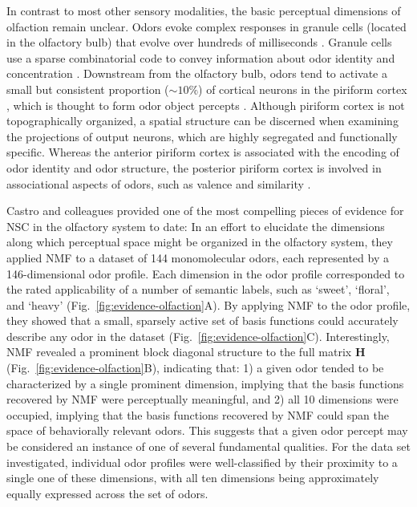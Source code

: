 In contrast to most other sensory modalities, 
the basic perceptual dimensions of olfaction remain unclear.
Odors evoke complex responses in granule cells (located in the olfactory bulb)
that evolve over hundreds of milliseconds \cite{Broome2006}.
Granule cells use a sparse combinatorial code to convey information about odor identity
and concentration \cite{Koulakov2011,Gupta2015}.
Downstream from the olfactory bulb, odors tend to activate a small but consistent
proportion ($\sim 10\%$) of cortical neurons in the piriform cortex \cite{poo2009},
which is thought to form odor object percepts \cite{chen2014,stettler2009}.
Although piriform cortex is not topographically organized,
a spatial structure can be discerned when examining the projections of output neurons,
which are highly segregated and functionally specific.
Whereas the anterior piriform cortex is associated with the encoding of 
odor identity and odor structure, 
the posterior piriform cortex is involved in associational aspects of odors, 
such as valence and similarity \cite{chen2014,gottfried2006}.

Castro and colleagues \cite{Castro2013} provided 
one of the most compelling pieces of evidence for \ac{NSC}
in the olfactory system to date:
In an effort to elucidate the dimensions along which perceptual space might be
organized in the olfactory system,
they applied \ac{NMF} to a dataset of 144 monomolecular odors,
each represented by a 146-dimensional odor profile.
Each dimension in the odor profile corresponded to the rated applicability of
a number of semantic labels, such as `sweet', `floral', and `heavy'
(Fig.~\ref{fig:evidence-olfaction}A).
By applying \ac{NMF} to the odor profile, they showed that a small, sparsely active set of basis functions could accurately describe any odor in the dataset
(Fig.~\ref{fig:evidence-olfaction}C).
Interestingly, \ac{NMF} revealed a prominent block
diagonal structure to the full matrix \textbf{H}
(Fig.~\ref{fig:evidence-olfaction}B), indicating that:
1) a given odor tended to be characterized by a single prominent dimension,
implying that the basis functions recovered by \ac{NMF} were perceptually meaningful,
and 2) all 10 dimensions were occupied,
implying that the basis functions recovered by \ac{NMF} could span the space of
behaviorally relevant odors.
This suggests that a given odor percept may be considered an 
instance of one of several fundamental qualities.
For the data set investigated, individual odor profiles were well-classified 
by their proximity to a single one of these dimensions, 
with all ten dimensions being approximately equally expressed 
across the set of odors.

